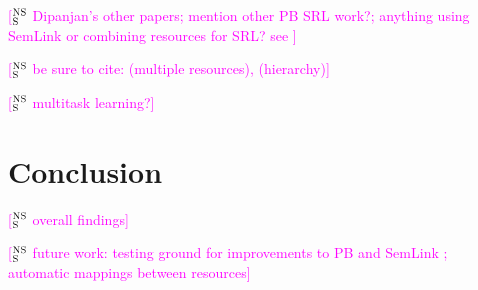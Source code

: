 \documentclass[11pt,a4paper]{article}
\newcommand{\ensuretext}[1]{#1}
\newcommand{\nssmarker}{\ensuretext{\textcolor{magenta}{\ensuremath{^{\textsc{NS}}_{\textsc{S}}}}}}
\newcommand{\arkcomment}[3]{\ensuretext{\textcolor{#3}{[#1 #2]}}}
\newcommand{\nss}[1]{\arkcomment{\nssmarker}{#1}{magenta}}
\newcommand{\finalversion}[1]{}
\begin{document}
\nss{Dipanjan's other papers; mention other PB SRL work?; anything using SemLink or combining resources for SRL? see \citep[\S4]{bonial-13}}

\nss{be sure to cite: \citep{shi-05} (multiple resources), \citep{matsubayashi-09} (hierarchy)}

\nss{multitask learning?}

\section{Conclusion}

\nss{overall findings}

\nss{future work: testing ground for improvements to PB \citep{bonial-14} and SemLink \citep{bonial-13}; automatic mappings between resources}

\finalversion{\section*{Acknowledgments}

FUNDING}

\smaller


\setlength{\bibsep}{1pt}
{\fontsize{10}{12.25}\selectfont
}
\end{document}
